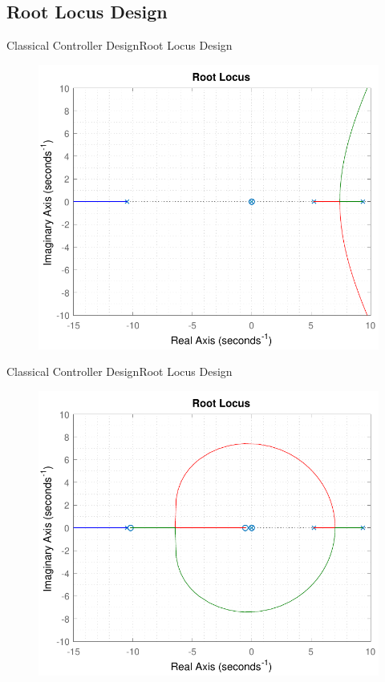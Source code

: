 \subsection{Root Locus Design}
\begin{frame}{Classical Controller Design}{Root Locus Design}	
	\begin{figure}
	\includegraphics[scale=.55]{Pictures/RLController1}
	\centering
	\end{figure}
\end{frame}

\begin{frame}{Classical Controller Design}{Root Locus Design}	
	\begin{figure}
		\includegraphics[scale=.55]{Pictures/RLController2}
		\centering
	\end{figure}
\end{frame}

